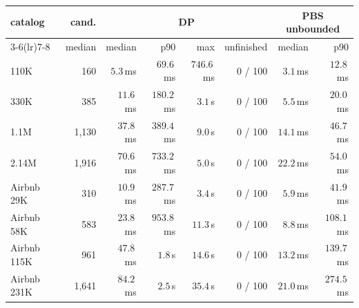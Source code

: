 \begin{tabular}{lrrrrrrr}
\toprule
catalog & cand. & \multicolumn{4}{c}{DP} & \multicolumn{2}{c}{PBS unbounded} \\
\cmidrule(lr){3-6}\cmidrule(lr){7-8}
 & median & median & p90 & max & unfinished & median & p90 \\
\midrule
110K & 160 & $5.3$\,ms & $69.6$\,ms & $746.6$\,ms & 0 / 100 & $3.1$\,ms & $12.8$\,ms \\
330K & 385 & $11.6$\,ms & $180.2$\,ms & $3.1$\,s & 0 / 100 & $5.5$\,ms & $20.0$\,ms \\
1.1M & 1,130 & $37.8$\,ms & $389.4$\,ms & $9.0$\,s & 0 / 100 & $14.1$\,ms & $46.7$\,ms \\
2.14M & 1,916 & $70.6$\,ms & $733.2$\,ms & $5.0$\,s & 0 / 100 & $22.2$\,ms & $54.0$\,ms \\
Airbnb 29K & 310 & $10.9$\,ms & $287.7$\,ms & $3.4$\,s & 0 / 100 & $5.9$\,ms & $41.9$\,ms \\
Airbnb 58K & 583 & $23.8$\,ms & $953.8$\,ms & $11.3$\,s & 0 / 100 & $8.8$\,ms & $108.1$\,ms \\
Airbnb 115K & 961 & $47.8$\,ms & $1.8$\,s & $14.6$\,s & 0 / 100 & $13.2$\,ms & $139.7$\,ms \\
Airbnb 231K & 1,641 & $84.2$\,ms & $2.5$\,s & $35.4$\,s & 0 / 100 & $21.0$\,ms & $274.5$\,ms \\
\bottomrule
\end{tabular}
